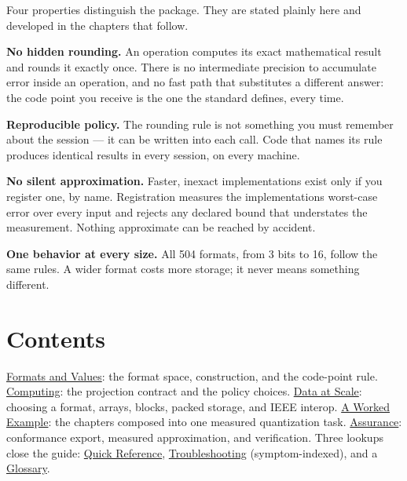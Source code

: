 \label{7414548155304843999}{}


Four properties distinguish the package. They are stated plainly here and developed in the chapters that follow.



\textbf{No hidden rounding.} An operation computes its exact mathematical result and rounds it exactly once. There is no intermediate precision to accumulate error inside an operation, and no fast path that substitutes a different answer: the code point you receive is the one the standard defines, every time.



\textbf{Reproducible policy.} The rounding rule is not something you must remember about the session — it can be written into each call. Code that names its rule produces identical results in every session, on every machine.



\textbf{No silent approximation.} Faster, inexact implementations exist only if you register one, by name. Registration measures the implementation{\textquotesingle}s worst-case error over every input and rejects any declared bound that understates the measurement. Nothing approximate can be reached by accident.



\textbf{One behavior at every size.} All 504 formats, from 3 bits to 16, follow the same rules. A wider format costs more storage; it never means something different.



\section{Contents}



\label{17095889498970318110}{}


\href{values.md}{Formats and Values}: the format space, construction, and the code-point rule. \href{computing.md}{Computing}: the projection contract and the policy choices. \href{data.md}{Data at Scale}: choosing a format, arrays, blocks, packed storage, and IEEE interop. \href{worked\_example.md}{A Worked Example}: the chapters composed into one measured quantization task. \href{assurance.md}{Assurance}: conformance export, measured approximation, and verification. Three lookups close the guide: \href{reference.md}{Quick Reference}, \href{troubleshooting.md}{Troubleshooting} (symptom-indexed), and a \href{glossary.md}{Glossary}.



